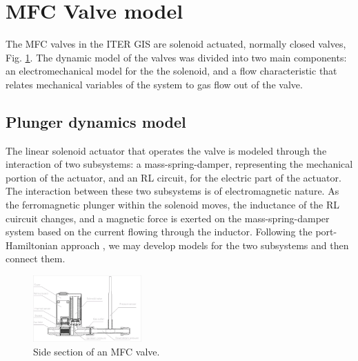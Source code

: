\documentclass[letterpaper, 10pt, conference]{ieeeconf}
\begin{document}
\section{MFC Valve model}\label{sec:vlvmdl}
The MFC valves in the ITER GIS are solenoid actuated, normally closed valves, Fig. \ref{fig:valvesec}. 
The dynamic model of the valves was divided into two main components: an electromechanical model for the the solenoid, and a flow characteristic that relates mechanical variables of the system to gas flow out of the valve.
\subsection{Plunger dynamics model} \label{sec:plung}
The linear solenoid actuator that operates the valve is modeled through the interaction of two subsystems: a mass-spring-damper, representing the mechanical portion of the actuator, and an RL circuit, for the electric part of the actuator. 
The interaction between these two subsystems is of electromagnetic nature. As the ferromagnetic plunger within the solenoid moves, the inductance of the RL cuircuit changes, and a magnetic force is exerted on the mass-spring-damper system based on the current flowing through the inductor. Following the port-Hamiltonian approach \cite{PHintro}, we may develop models for the two subsystems and then connect them.
\begin{figure}[!ht]
    \centering
     \includegraphics[width=0.37\textwidth]{valvesection}
     \caption{Side section of an MFC valve.}
     \label{fig:valvesec}
\end{figure}
\end{document}
